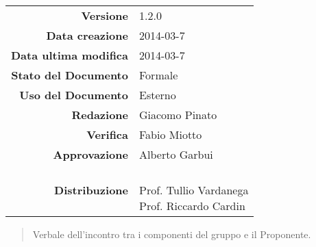 
\newcommand{\Versione}{1.2.0}						%
\newcommand{\Data}{2014-03-7}						%
\newcommand{\DataUltimaModifica}{2014-03-7}
\newcommand{\TipoDocumento}{Verbale esterno 2014-03-5}		%




\begin{center}
\begin{tabular}{r|l}
\textbf{Versione} & \Versione{} \\
\textbf{Data creazione} & \Data{} \\
\textbf{Data ultima modifica} & \DataUltimaModifica{} \\
\textbf{Stato del Documento} & Formale \\		%
\textbf{Uso del Documento} & Esterno \\			%
\textbf{Redazione} & Giacomo Pinato\\				%
\textbf{Verifica} & Fabio Miotto\\		%
\textbf{Approvazione} & Alberto Garbui \\		%
\textbf{Distribuzione} & \parbox[t]{4cm}{\NomeGruppo{} \\Prof. Tullio Vardanega \\ Prof. Riccardo Cardin \\ \Prop{} }\\
\end{tabular}
\end{center}

\vspace{0.05in}

\begin{abstract}
\begin{center}
Verbale dell'incontro tra i componenti del gruppo \NomeGruppo{} e il Proponente.
\end{center}
\end{abstract}

